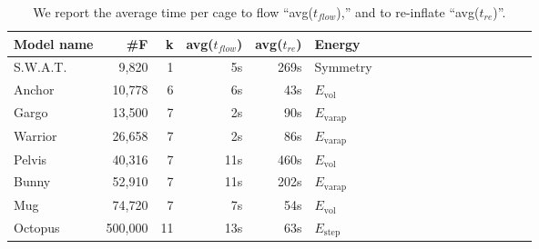 \begin{table}
\centering
{}
\setlength{\tabcolsep}{5.5pt}
\begin{tabular}{l r r r r l r r r r r r r r r r r r}
\rowcolor{white}
Model name  & \#F & k & avg($t_{flow}$) & avg($t_{re}$) & Energy\\
\midrule
S.W.A.T. & 9,820 & 1 & 5s & 269s & Symmetry \\
Anchor & 10,778 & 6 & 6s & 43s & $E_\text{vol}$ \\
Gargo & 13,500 & 7 & 2s & 90s & $E_\text{varap}$\\
Warrior & 26,658 & 7 & 2s & 86s & $E_\text{varap}$  \\
Pelvis & 40,316 & 7 & 11s & 460s & $E_\text{vol}$  \\
Bunny & 52,910 & 7 & 11s & 202s & $E_\text{varap}$ \\
Mug & 74,720 & 7 & 7s & 54s & $E_\text{vol}$ \\
Octopus & 500,000 & 11 & 13s & 63s & $E_\text{step}$ \\
\bottomrule
\end{tabular}
\caption{
We report the average time per cage to flow ``avg($t_{flow}$),'' and to
re-inflate ``avg($t_{re}$)''.}
\label{tab:timings}
\end{table}
